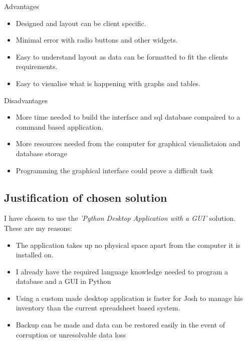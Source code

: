 Advantages
\begin{itemize}
    \item Designed and layout can be client specific.
    \item Minimal error with radio buttons and other widgets.
    \item Easy to understand layout as data can be formatted to fit the clients requirements.
    \item Easy to visualise what is happening with graphs and tables.
\end{itemize}

Disadvantages
\begin{itemize}
    \item More time needed to build the interface and sql database compaired to a command based application.
    \item More resources needed from the computer for graphical visualistaion and database storage 
    \item Programming the graphical interface could prove a difficult task\\
\end{itemize}\hline


\subsection{Justification of chosen solution}


I have chosen to use the \emph{'Python Desktop Application with a GUI'} solution. \\

\noindent These are my reasons:

\begin{itemize}
    \item The application takes up no physical space apart from the computer it is installed on.
    \item I already have the required language knowledge needed to program a database and a GUI in Python
    \item Using a custom made desktop application is faster for Josh to manage his inventory than the current spreadsheet based system.
    \item Backup can be made and data can be restored easily in the event of corruption or unresolvable data loss
\end{itemize}
